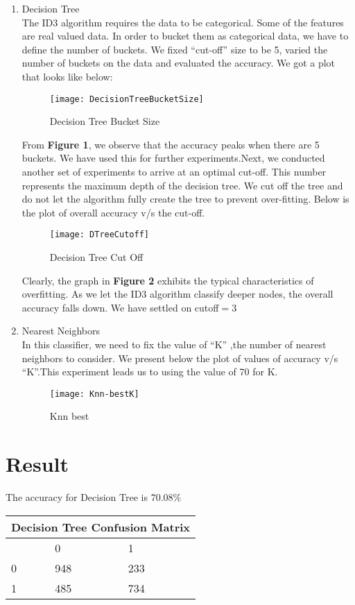 \documentclass{article}
\begin{document}
\begin{enumerate}
\item Decision Tree\\
The ID3 algorithm requires the data to be categorical. Some of the features are real valued data. In order to bucket them as categorical data, we have to define the number of buckets. We fixed “cut-off” size to be 5, varied the number of buckets on the data and evaluated the accuracy. We got a plot that looks like below:

\begin{figure}[h]
      \centering
    \texttt{[image: DecisionTreeBucketSize]}
    \caption{Decision Tree Bucket Size}
\end{figure}



From \textbf{Figure 1}, we observe that the accuracy peaks when there are 5 buckets. We have used this for further experiments.Next, we conducted another set of experiments to arrive at an optimal cut-off. This number represents the maximum depth of the decision tree. We cut off the tree and do not let the algorithm fully create the tree to prevent over-fitting. Below is the plot of overall accuracy v/s the cut-off.
\begin{figure}[h]
      \centering
    \texttt{[image: DTreeCutoff]}
    \caption{Decision Tree Cut Off}
\end{figure}
Clearly, the graph in \textbf{Figure 2} exhibits the typical characteristics of overfitting. As we let the ID3 algorithm classify deeper nodes, the overall accuracy falls down. We have settled on cutoff$=$3


\item Nearest Neighbors\\
In this classifier, we need to fix the value of “K” ,the number of nearest neighbors to consider. We present below the plot of values of accuracy v/s “K”.This experiment leads us to using the value of 70 for K.
\begin{figure}[h]
    \centering
    \texttt{[image: Knn-bestK]}
    \caption{Knn best}
\end{figure}


\end{enumerate}

\section{Result}
The accuracy for Decision Tree is $70.08 \%$
\begin{center}
\begin{tabular}{ |p{3cm}|p{3cm}|p{3cm}|  }
\hline
\multicolumn{3}{|c|}{Decision Tree Confusion Matrix } \\
 \hline
 & 0 & 1\\
 \hline
 0&948    &233\\
 1&485  & 734 \\
 
 \hline
\end{tabular}
\end{center}
\end{document}
